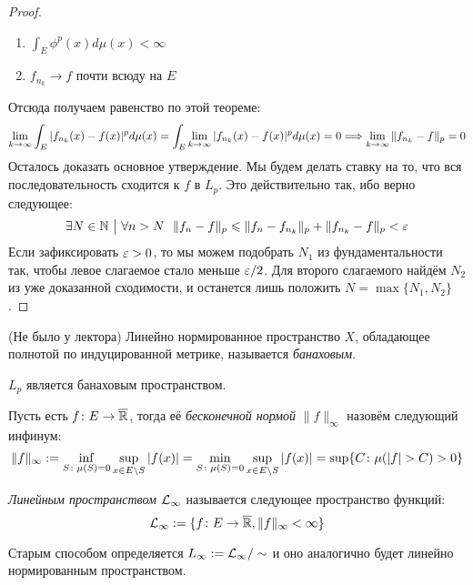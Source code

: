 \begin{proof}
\begin{enumerate}
		\item $\int_E \phi^p(x)d\mu(x) < \infty$
		
		\item $f_{n_k} \to f$ почти всюду на $E$
	\end{enumerate}
	Отсюда получаем равенство по этой теореме:
	\[
		\lim_{k \to \infty} \int_E |f_{n_k}(x) - f(x)|^pd\mu(x) = \int_E \lim_{k \to \infty} |f_{n_k}(x) - f(x)|^pd\mu(x) = 0 \Longrightarrow \lim_{k \to \infty} \|f_{n_k} - f\|_p = 0
	\]
	Осталось доказать основное утверждение. Мы будем делать ставку на то, что вся последовательность сходится к $f$ в $L_p$. Это действительно так, ибо верно следующее:
	\[
		\exists N \in \mathbb{N} \ \big|\  \forall n > N\ \ \|f_n - f\|_p \leqslant \|f_n - f_{n_k}\|_p + \|f_{n_k} - f\|_p < \varepsilon
	\]
	Если зафиксировать $\varepsilon > 0$, то мы можем подобрать $N_1$ из фундаментальности так, чтобы левое слагаемое стало меньше $\varepsilon / 2$. Для второго слагаемого найдём $N_2$ из уже доказанной сходимости, и останется лишь положить $N = \max\{N_1, N_2\}$.
\end{proof}

\begin{definition} (Не было у лектора)
	Линейно нормированное пространство $X$, обладающее полнотой по индуцированной метрике, называется \textit{банаховым}.
\end{definition}

\begin{corollary}
	$L_p$ является банаховым пространством.
\end{corollary}

\begin{definition}
	Пусть есть $f \colon E \to \overline{\mathbb{R}}$, тогда её \textit{бесконечной нормой} $\|f\|_\infty$ назовём следующий инфинум:
	\[
		\|f\|_\infty := \inf_{S \colon \mu(S) = 0} \sup_{x \in E \backslash S} |f(x)| = \min_{S \colon \mu(S) = 0} \sup_{x \in E \backslash S} |f(x)| = \sup \{C \colon \mu(|f| > C) > 0\}
	\]
\end{definition}

\begin{definition}
	\textit{Линейным пространством $\mathcal{L}_\infty$} называется следующее пространство функций:
	\[
		\mathcal{L}_\infty := \{f \colon E \to \overline{\mathbb{R}}, \|f\|_\infty < \infty\}
	\]
\end{definition}

\begin{note}
	Старым способом определяется $L_\infty := \mathcal{L}_\infty / \sim$ и оно аналогично будет линейно нормированным пространством.
\end{note}

